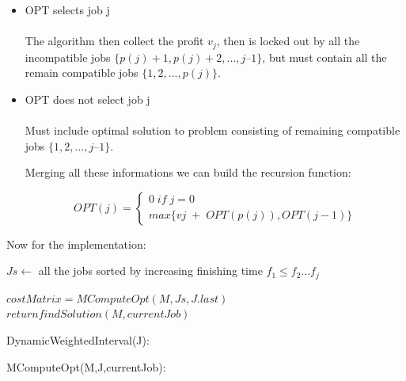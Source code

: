 \documentclass[11pt]{article}
\begin{document}
\begin{itemize}

\item {OPT selects job j}\\\\
The algorithm then collect the profit $v_{j}$, then is locked out by all the incompatible jobs $\{ p(j) + 1, p(j) + 2, ..., j – 1 \}$, but must contain all the remain compatible jobs $\{1, 2, ..., p(j)\}$.

\item {OPT does not select job j}\\\\
Must include optimal solution to problem consisting of remaining compatible jobs $\{1, 2, ..., j – 1\}$.

Merging all these informations we can build the recursion function:

\[OPT(j) = \begin{cases} 0 \; if \; j = 0 \\ max\{vj \; + \; OPT(p(j)), OPT(j−1)\}  \end{cases}\]

\end{itemize}

Now for the implementation:

\begin{algorithm}[H]
\SetAlgoLined
\small
{}
\BlankLine

$Js \leftarrow$ all the jobs sorted by increasing finishing time $f_{1} \leq f_{2} ... f_{j}$

\BlankLine


\BlankLine

$costMatrix = MComputeOpt(M,Js,J.last)$\;
$return findSolution(M,currentJob)$

\caption{DynamicWeightedInterval(J):}
\end{algorithm}

\begin{algorithm}[H]
\SetAlgoLined
\small
{}

\BlankLine
	

\BlankLine

\caption{MComputeOpt(M,J,currentJob):}
\end{algorithm}
\end{document}
